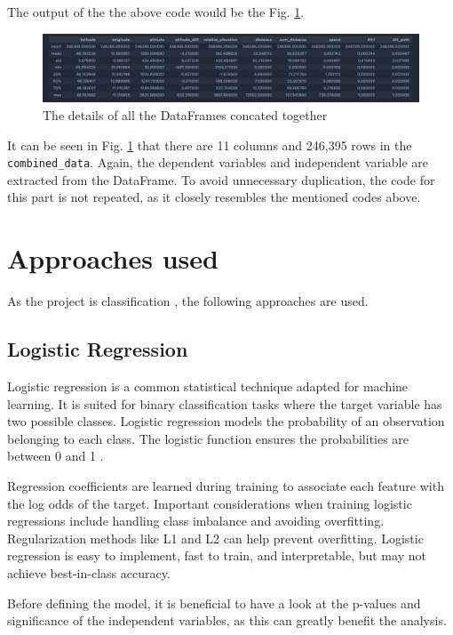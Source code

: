 The output of the the above code would be the Fig. \ref{fig:df_describe}.

\begin{figure}[htb]
	\includegraphics[width=\textwidth]{resources/df_describe.png}
	\caption{The details of all the DataFrames concated together}
	\label{fig:df_describe}
\end{figure}

It can be seen in Fig. \ref{fig:df_describe} that there are 11 columns 
and 246,395 rows in the \texttt{combined\_data}.
Again, the dependent variables and independent variable are extracted from the DataFrame.
To avoid unnecessary duplication, the code for this part is not repeated, as it closely resembles the mentioned codes above.

\section{Approaches used}

As the project is classification \cite{osisanwo2017supervised}, the following approaches are used.

\subsection{Logistic Regression}
Logistic regression is a common statistical technique adapted for machine learning. It is suited for binary classification tasks where the target variable has two possible classes. Logistic regression models the probability of an observation belonging to each class. The logistic function ensures the probabilities are between 0 and 1 \cite{hosmer2013applied}.

Regression coefficients are learned during training to associate each feature with the log odds of the target. Important considerations when training logistic regressions include handling class imbalance and avoiding overfitting. Regularization methods like L1 and L2 can help prevent overfitting. Logistic regression is easy to implement, fast to train, and interpretable, but may not achieve best-in-class accuracy.

Before defining the model, it is beneficial to have a look at the p-values and significance of the independent variables, as this can greatly benefit the analysis.

